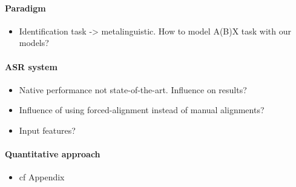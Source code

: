 \paragraph{Paradigm}
\begin{itemize}
  \item Identification task -> metalinguistic. How to model A(B)X task with our models?
  \end{itemize}

\paragraph{ASR system}
\begin{itemize}
\item Native performance not state-of-the-art. Influence on results?
\item Influence of using forced-alignment instead of manual alignments?
\item Input features?
  \end{itemize}

 \paragraph{Quantitative approach}
\begin{itemize}
\item cf Appendix
  \end{itemize} 
